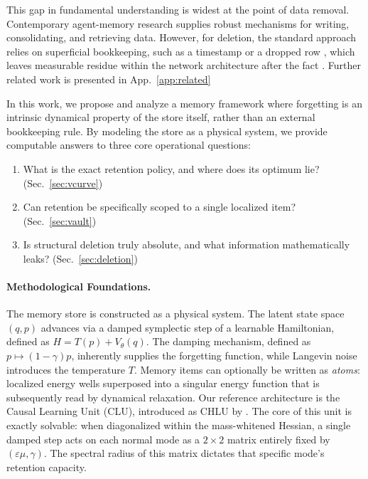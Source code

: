 \documentclass{article}
\begin{document}
This gap in fundamental understanding is widest at the point of data removal. Contemporary agent-memory research supplies robust mechanisms for writing, consolidating, and retrieving data. However, for deletion, the standard approach relies on superficial bookkeeping, such as a timestamp or a dropped row \citep{rasmussen_zep_2025,chhikara_mem0_2025}, which leaves measurable residue within the network architecture after the fact \citep{chakraborttii_ghost_2026,wang_memleak_2026}. Further related work is presented in App.~\ref{app:related}

In this work, we propose and analyze a memory framework where forgetting is an intrinsic dynamical property of the store itself, rather than an external bookkeeping rule. By modeling the store as a physical system, we provide computable answers to three core operational questions:
\begin{enumerate}
    \item What is the exact retention policy, and where does its optimum lie? (Sec.~\ref{sec:vcurve})
    \item Can retention be specifically scoped to a single localized item? (Sec.~\ref{sec:vault})
    \item Is structural deletion truly absolute, and what information mathematically leaks? (Sec.~\ref{sec:deletion})
\end{enumerate}

\paragraph{Methodological Foundations.}
The memory store is constructed as a physical system. The latent state space $(q,p)$ advances via a damped symplectic step of a learnable Hamiltonian, defined as $H=T(p)+V_\theta(q)$. The damping mechanism, defined as $p\mapsto(1-\gamma)p$, inherently supplies the forgetting function, while Langevin noise introduces the temperature $T$. Memory items can optionally be written as \emph{atoms}: localized energy wells superposed into a singular energy function that is subsequently read by dynamical relaxation. Our reference architecture is the Causal Learning Unit (CLU), introduced as CHLU by \citet{jawahar_chlu_2026}. The core of this unit is exactly solvable: when diagonalized within the mass-whitened Hessian, a single damped step acts on each normal mode as a $2\times2$ matrix entirely fixed by $(\varepsilon\mu,\gamma)$. The spectral radius of this matrix dictates that specific mode's retention capacity.
\end{document}
